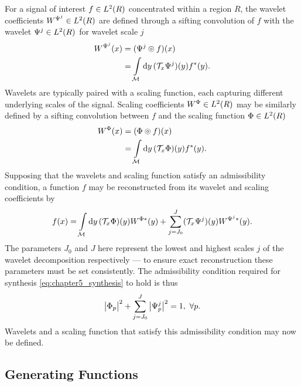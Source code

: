 For a signal of interest \(f \in L^{2}(R)\) concentrated within a region \(R\), the wavelet coefficients \(W^{\Psi^{j}} \in L^{2}(R)\) are defined through a sifting convolution of \(f\) with the wavelet \(\Psi^{j} \in L^{2}(R)\) for wavelet scale \(j\)
%
\begin{align}
	W^{\Psi^{j}}(x)
	 & = (\Psi^{j} \circledcirc{} f)(x) \nonumber                                \\
	 & = \displaystyle\int\limits_{\mathcal{M}} \dd{y} (\mathcal{T}_{x}\Psi^{j})(y) f^{\ast}(y).
\end{align}
%
Wavelets are typically paired with a scaling function, each capturing different underlying scales of the signal.
Scaling coefficients \(W^{\Phi} \in L^{2}(R)\) may be similarly defined by a sifting convolution between \(f\) and the scaling function \(\Phi \in L^{2}(R)\)
%
\begin{align}
	W^{\Phi}(x)
	 & = (\Phi \circledcirc{} f)(x) \nonumber                                \\
	 & = \displaystyle\int\limits_{\mathcal{M}} \dd{y} (\mathcal{T}_{x}\Phi)(y) f^{\ast}(y).
\end{align}
%
Supposing that the wavelets and scaling function satisfy an admissibility condition, a function \(f\) may be reconstructed from its wavelet and scaling coefficients by
%
\begin{equation}\label{eq:chapter5_synthesis}
	f(x)
	= \displaystyle\int\limits_{\mathcal{M}} \dd{y}
	(\mathcal{T}_{x}\Phi)(y) W^{\Phi\ast}(y)
	+ \displaystyle\sum\limits_{j=J_{0}}^{J} (\mathcal{T}_{x}\Psi^{j})(y) W^{\Psi^{j}\ast}(y).
\end{equation}
%
The parameters \(J_{0}\) and \(J\) here represent the lowest and highest scales \(j\) of the wavelet decomposition respectively --- to ensure exact reconstruction these parameters must be set consistently.
The admissibility condition required for synthesis \cref{eq:chapter5_synthesis} to hold is thus
%
\begin{equation}\label{eq:chapter5_admissibility}
	\big\lvert{\Phi}_{p}\big\rvert^{2}
	+ \displaystyle\sum\limits_{j=J_{0}}^{J} \big\lvert{\Psi}_{p}^{j}\big\rvert^{2}
	= 1,\ \forall p.
\end{equation}
%
Wavelets and a scaling function that satisfy this admissibility condition may now be defined.

\subsection{Generating Functions}\label{sec:chapter5_generating_functions}

